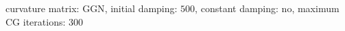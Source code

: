 curvature matrix: $\text{GGN}$, initial damping: $\num[scientific-notation=false]{500}$, constant damping: $\text{no}$, maximum CG iterations: $\num[scientific-notation=false]{300}$